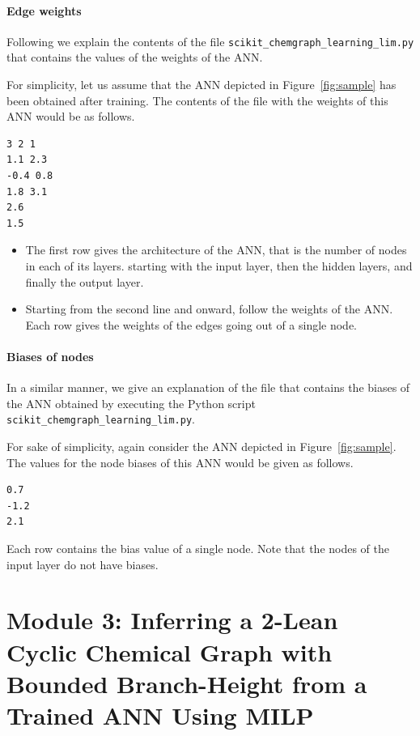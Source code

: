 \documentclass[11pt,titlepage,dvipdfmx,twoside]{book}
\newcommand{\figref}[1]{Figure~\ref{fig:#1}}
\begin{document}
\subsubsection{Edge weights}
Following we explain the contents of the file
\verb|scikit_chemgraph_learning_lim.py|
that contains the values of the weights of the ANN.


For simplicity, let us assume that the ANN depicted
in \figref{sample} has been obtained after training.
The contents of the file with the weights of this ANN
would be as follows.
%
\begin{oframed}
{\small
\begin{verbatim}
3 2 1
1.1 2.3
-0.4 0.8
1.8 3.1
2.6
1.5
\end{verbatim}
}
\end{oframed}
%
\begin{itemize}
\item 
The first row gives the architecture of the ANN,
that is the number of nodes in each of its layers.
starting with the input layer, then the hidden layers, and
finally the output layer.

\item 
Starting from the second line and onward,
follow the weights of the ANN.
Each row gives the weights of the edges going out of a single node.
\end{itemize}


\subsubsection{Biases of nodes}
In a similar manner,
we give an explanation of the file that contains the
biases of the ANN obtained
by executing the Python script \verb|scikit_chemgraph_learning_lim.py|.

For sake of simplicity, again consider
the ANN depicted in \figref{sample}.
The values for the node biases of this ANN would be given as follows.
%
\begin{oframed}
{\small
\begin{verbatim}
0.7
-1.2
2.1
\end{verbatim}
}
\end{oframed}
Each row contains the bias value of a single node.
Note that the nodes of the input layer do not have biases.



\chapter{Module 3:
Inferring a 2-Lean Cyclic Chemical Graph with Bounded Branch-Height
from a Trained ANN Using MILP
}
\end{document}

